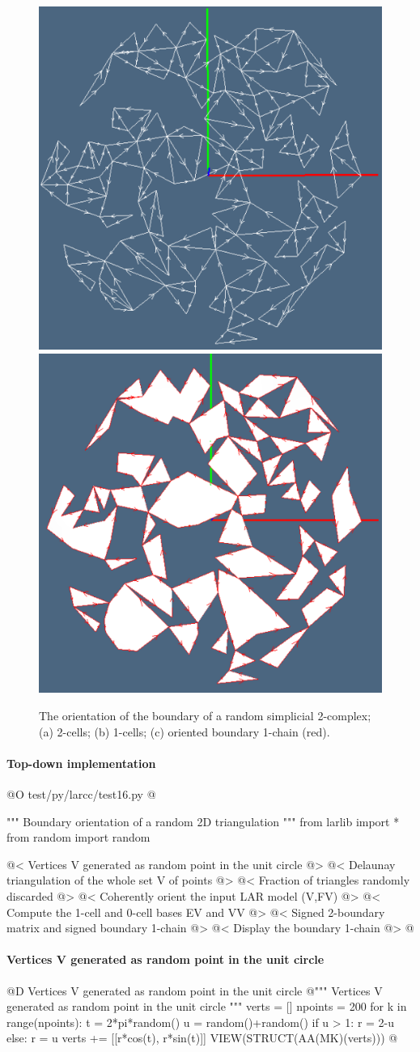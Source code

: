 \documentclass[11pt,oneside]{article}	%
\begin{document}
\begin{figure}[htbp]
   \includegraphics[height=0.328\linewidth,width=0.328\linewidth]{images/randomdelaunay2} 
   \includegraphics[height=0.328\linewidth,width=0.328\linewidth]{images/randomdelaunay3} 
   \caption{The orientation of the boundary of a random simplicial 2-complex;
   (a) 2-cells; (b) 1-cells; (c) oriented boundary 1-chain (red).}
   \label{randomdelaunay}
\end{figure}


\paragraph{Top-down implementation}

@O test/py/larcc/test16.py
@{""" Boundary orientation of a random 2D triangulation """
from larlib import *
from random import random

@< Vertices V generated as random point in the unit circle @>
@< Delaunay triangulation of the whole set V of points @>
@< Fraction of triangles randomly discarded @>
@< Coherently orient the input LAR model (V,FV)  @>
@< Compute the 1-cell and 0-cell bases EV and VV @>
@< Signed 2-boundary matrix and signed boundary 1-chain @>	
@< Display the boundary 1-chain @>
@}

\paragraph{Vertices V generated as random point in the unit circle}
@D Vertices V generated as random point in the unit circle
@{""" Vertices V generated as random point in the unit circle """
verts = []
npoints = 200
for k in range(npoints):
	t = 2*pi*random()
	u = random()+random()
	if u > 1: r = 2-u 
	else: r = u
	verts += [[r*cos(t), r*sin(t)]]
VIEW(STRUCT(AA(MK)(verts)))
@}
\end{document}
